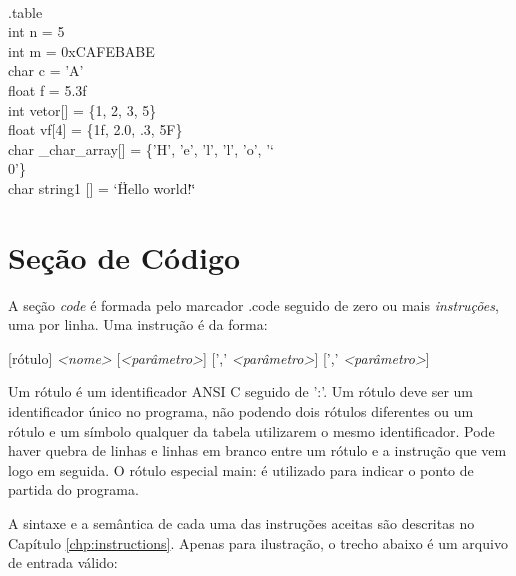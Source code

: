 \documentclass[12pt,a4paper,extrafontsizes,article]{memoir}
\newcommand*{\srcfont}{\fontfamily{pcr}\selectfont}
\begin{document}
{\srcfont
{}\\
{\color{gray}.table}\\
{\color{blue}int} n = {\color{orange}5}\\
{\color{blue}int} m = {\color{orange}0xCAFEBABE}\\
{\color{blue}char} c = {\color{orange}'A'}\\
{\color{blue}float} f = {\color{orange}5.3f}\\
{\color{blue}int} vetor[] = \{{\color{orange}1}, {\color{orange}2}, {\color{orange}3}, {\color{orange}5}\}\\
{\color{blue}float} vf[4] = \{{\color{orange}1f}, {\color{orange}2.0}, {\color{orange}.3}, {\color{orange}5F}\}\\
{\color{blue}char} \_char\_array[] = \{{\color{orange}'H'}, {\color{orange}'e'}, {\color{orange}'l'},
{\color{orange}'l'}, {\color{orange}'o'}, {\color{orange}'\char`\\0'}\}\\
{\color{blue}char} string1 [] = {\color{orange}\char`\"Hello world!\char`\"}
}

\section{Seção de Código}

A seção \textit{code} é formada pelo marcador {\srcfont .code} seguido de zero ou mais \textit{instruções}, uma por
linha. Uma instrução é da forma:

\bigskip
{\srcfont\scriptsize [rótulo] \textit{<nome>} [\textit{<parâmetro>}] [',' \textit{<parâmetro>}] [','
\textit{<parâmetro>}]\color{red}{\char`\\n}}
\bigskip

Um rótulo é um identificador ANSI C seguido de {\srcfont ':'}. Um rótulo deve ser um identificador único no programa,
não podendo dois rótulos diferentes ou um rótulo e um símbolo qualquer da tabela utilizarem o mesmo identificador. Pode
haver quebra de linhas e linhas em branco entre um rótulo e a instrução que vem logo em seguida. O rótulo especial
{\srcfont main:} é utilizado para indicar o ponto de partida do programa.

A sintaxe e a semântica de cada uma das instruções aceitas são descritas no Capítulo \ref{chp:instructions}. Apenas para
ilustração, o trecho abaixo é um arquivo de entrada válido:\\
\end{document}
